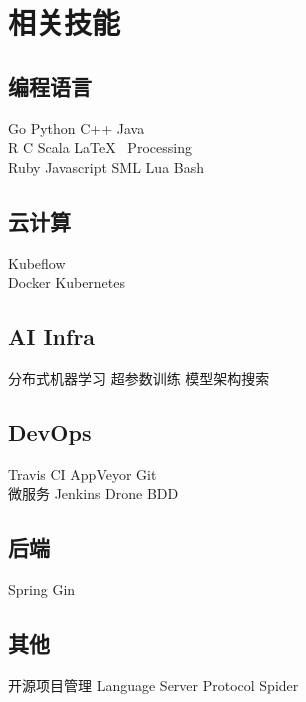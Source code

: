 \documentclass[]{deedy-resume-openfont}
\begin{document}
\newpage
\pagestyle{fancy}
\fancyhf{}


\begin{minipage}[t]{0.3\textwidth}


\section{相关技能}
\sectionsep
\subsection{编程语言}
Go \textbullet{} Python \textbullet{} C++ \textbullet{} Java \\
R \textbullet{} C \textbullet{} Scala \textbullet{} \LaTeX\ \textbullet{} Processing \\
Ruby \textbullet{} Javascript \textbullet{} SML \textbullet{} Lua \textbullet{} Bash \\
\sectionsep

\subsection{云计算}
Kubeflow  \\
Docker \textbullet{} Kubernetes \\
\sectionsep

\subsection{AI Infra}
分布式机器学习 \textbullet{} 超参数训练 \textbullet{} 模型架构搜索 \\
\sectionsep

\subsection{DevOps}
Travis CI \textbullet{} AppVeyor \textbullet{} Git \\
微服务 \textbullet{} Jenkins \textbullet{} Drone \textbullet{} BDD \\
\sectionsep

\subsection{后端}
Spring \textbullet{} Gin \\
\sectionsep

\subsection{其他}
开源项目管理 \textbullet{} Language Server Protocol \textbullet{} Spider \\
\sectionsep

\end{minipage}
\end{document}
